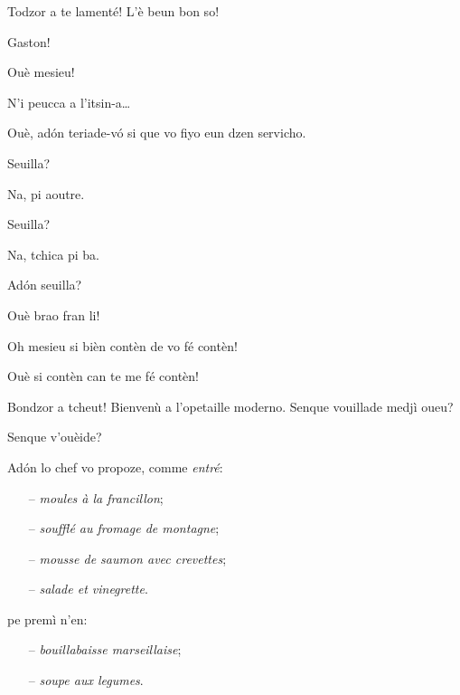 \begin{drama}
\Casimirspeaks Todzor a te lamenté! L'è beun bon so!

\PersEmpourtantaspeaks {} Gaston!

\Eunfeurmispeaks Ouè mesieu!

\PersEmpourtantaspeaks N’i peucca a l’itsin-a\ldots

\Eunfeurmispeaks Ouè, ad\'on teriade-v\'o si que vo fiyo eun dzen servicho.


\Eunfeurmispeaks Seuilla?

\PersEmpourtantaspeaks Na, pi aoutre.

\Eunfeurmispeaks Seuilla?

\PersEmpourtantaspeaks Na, tchica pi ba.

\Eunfeurmispeaks Ad\'on seuilla?

\PersEmpourtantaspeaks Ouè brao fran li!

\Eunfeurmispeaks Oh mesieu si bièn contèn de vo fé contèn!

\PersEmpourtantaspeaks Ouè si contèn can te me fé contèn!


\Tsambrispeaks Bondzor a tcheut! Bienvenù a l’opetaille moderno. Senque vouillade medjì oueu?

\PersEmpourtantaspeaks Senque v'ouèide?

\Tsambrispeaks {} Ad\'on lo chef vo propoze, comme \textit{entré}:

\begin{itemize}
\item[--]  \textit{moules à la francillon};
\item[--]  \textit{soufflé au fromage de montagne};
\item[--]  \textit{mousse de saumon avec crevettes};
\item[--]  \textit{salade et vinegrette}.
\end{itemize}

pe premì n’en:

\begin{itemize}
\item[--]  \textit{bouillabaisse marseillaise};
\item[--]  \textit{soupe aux legumes}.
\end{itemize}


\end{drama}
